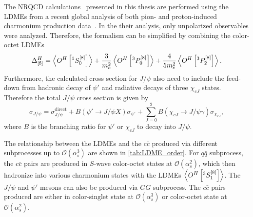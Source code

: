 \documentclass[../main.tex]{subfiles}
\begin{document}
The NRQCD calculations~\cite{chang2023a} presented in this thesis are performed using the LDMEs
from a recent global analysis of both pion- and proton-induced charmonium production data~\cite{chang2023}.
In the their analysis, only unpolarized observables were analyzed.
Therefore, the formalism can be simplified by combining the color-octet LDMEs
\begin{equation}
	\Delta^H_{[8]}=\expval{O^H\left[^1S_0^{\left[8\right]}\right]}+\frac{3}{m_c^2}\expval{O^H\left[^3P_0^{\left[8\right]}\right]}+\frac{4}{5m_c^2}\expval{O^H\left[^3P_2^{\left[8\right]}\right]}.
\end{equation}
Furthermore, the calculated cross section for $J/\psi$ also need to include the feed-down from hadronic decay
of $\psi'$ and radiative decays of three $\chi_{cJ}$ states.
Therefore the total $J/\psi$ cross section is given by
\begin{equation}
	\sigma_{J/\psi}=\sigma_{J/\psi}^{\mathrm{direct}}+B\left(\psi'\to J/\psi X\right)\sigma_{\psi'} +\sum_{J=0}^2 B\left(\chi_{cJ}\to J/\psi\gamma\right) \sigma_{\chi_{cJ}},
\end{equation}
where $B$ is the branching ratio for $\psi'$ or $\chi_{cJ}$ to decay into $J/\psi$.

The relationship between the LDMEs and the $c\bar{c}$ produced via different
subprocesses up to $\mathcal{O}\left(\alpha_s^3\right)$ are shown in \cref{tab:LDME_order}.
For $q\bar{q}$ subprocess, the $c\bar{c}$ pairs are produced in
$S$-wave color-octet states at $\mathcal{O}\left(\alpha_s^2\right)$,
which then hadronize into various charmonium states with the LDMEs $\expval{O^H\left[^3 S_1^{[8]}\right]}$.
The $J/\psi$ and $\psi'$ mesons can also be produced via $GG$ subprocess.
The $c\bar{c}$ pairs produced are either in color-singlet
state at $\mathcal{O}\left(\alpha_s^3\right)$ or color-octet state at $\mathcal{O}\left(\alpha_s^2\right)$.
\end{document}

